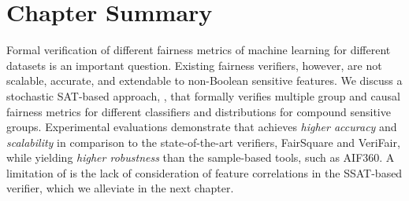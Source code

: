\section{Chapter Summary}
Formal verification of different fairness metrics of machine learning for different datasets is an important question. Existing fairness verifiers, however, are not scalable, accurate, and extendable to non-Boolean sensitive features. We discuss a stochastic SAT-based approach, {\justicia}, that formally verifies multiple group and causal fairness metrics for different classifiers and distributions for compound sensitive groups. Experimental evaluations demonstrate that {\justicia} achieves \textit{higher accuracy} and \textit{scalability} in comparison to the state-of-the-art verifiers, FairSquare and VeriFair, while yielding \textit{higher robustness} than the sample-based tools, such as AIF360.  A limitation of {\justicia} is the lack of consideration of feature correlations in the SSAT-based verifier, which we alleviate in the next chapter.


